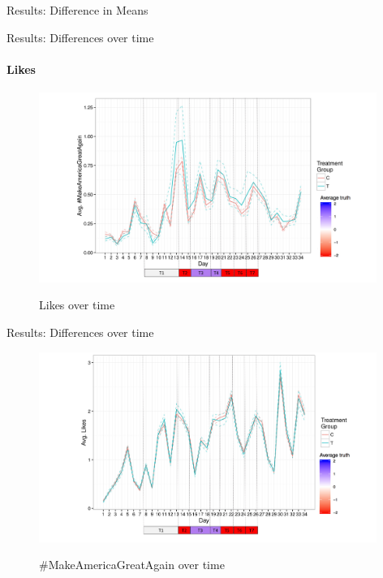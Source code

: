 \documentclass[10pt]{beamer}\usepackage[]{graphicx}\usepackage[]{color}
\begin{document}
\begin{frame}{Results: Difference in Means}

\small


\end{frame}





\begin{frame}{Results: Differences over time}
\framesubtitle{Likes}

\begin{figure}
\includegraphics[width=11cm]{../plots/likes_tweets.jpg}
\label{fig:likes_time}
\caption{Likes over time}
\end{figure}

\end{frame}

\begin{frame}{Results: Differences over time}

\begin{figure}
\includegraphics[width=11cm]{../plots/maga_tweets.jpg}
\label{fig:maga_time}
\caption{\#MakeAmericaGreatAgain over time}
\end{figure}

\end{frame}
\end{document}
